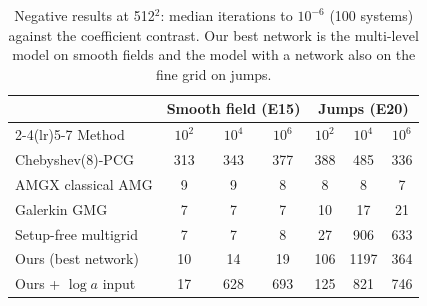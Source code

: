 \begin{table}[t]
\centering
\footnotesize
\setlength{\tabcolsep}{3pt}
\caption{Negative results at 512$^2$: median iterations to $10^{-6}$ (100 systems) against the coefficient contrast. Our best network is the multi-level model on smooth fields and the model with a network also on the fine grid on jumps.}
\label{tab:negative}
\begin{tabular}{lcccccc}
\toprule
& \multicolumn{3}{c}{Smooth field (E15)} & \multicolumn{3}{c}{Jumps (E20)} \\
\cmidrule(lr){2-4}\cmidrule(lr){5-7}
Method & $10^2$ & $10^4$ & $10^6$ & $10^2$ & $10^4$ & $10^6$ \\
\midrule
Chebyshev(8)-PCG & 313 & 343 & 377 & 388 & 485 & 336 \\
AMGX classical AMG & 9 & 9 & 8 & 8 & 8 & 7 \\
Galerkin GMG & 7 & 7 & 7 & 10 & 17 & 21 \\
Setup-free multigrid & 7 & 7 & 8 & 27 & 906 & 633 \\
Ours (best network) & 10 & 14 & 19 & 106 & 1197 & 364 \\
Ours + $\log a$ input & 17 & 628 & 693 & 125 & 821 & 746 \\
\bottomrule
\end{tabular}
\end{table}
